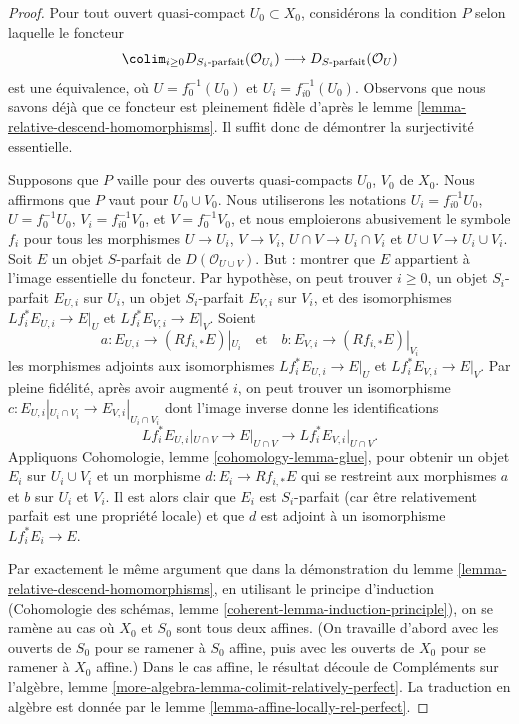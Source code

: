 \begin{proof}
Pour tout ouvert quasi-compact $U_0 \subset X_0$, considérons la condition $P$
selon laquelle le foncteur
$$
\colim_{i \geq 0} D_{S_i\text{-parfait}}(\mathcal{O}_{U_i})
\longrightarrow
D_{S\text{-parfait}}(\mathcal{O}_U)
$$
est une équivalence, où $U = f_0^{-1}(U_0)$ et $U_i = f_{i0}^{-1}(U_0)$.
Observons que nous savons déjà que ce foncteur est pleinement fidèle
d'après le lemme \ref{lemma-relative-descend-homomorphisms}. Il suffit donc de démontrer
la surjectivité essentielle.

\medskip\noindent
Supposons que $P$ vaille pour des ouverts quasi-compacts $U_0$, $V_0$ de $X_0$.
Nous affirmons que $P$ vaut pour $U_0 \cup V_0$. Nous utiliserons les notations
$U_i = f_{i0}^{-1}U_0$, $U = f_0^{-1}U_0$, $V_i = f_{i0}^{-1}V_0$,
et $V = f_0^{-1}V_0$, et nous emploierons abusivement le symbole
$f_i$ pour tous les morphismes $U \to U_i$, $V \to V_i$,
$U \cap V \to U_i \cap V_i$ et $U \cup V \to U_i \cup V_i$.
Soit $E$ un objet $S$-parfait de $D(\mathcal{O}_{U \cup V})$.
But : montrer que $E$ appartient à l'image essentielle du foncteur.
Par hypothèse,
on peut trouver $i \geq 0$, un objet $S_i$-parfait $E_{U, i}$ sur $U_i$,
un objet $S_i$-parfait $E_{V, i}$ sur $V_i$, et
des isomorphismes $Lf_i^*E_{U, i} \to E|_U$ et $Lf_i^*E_{V, i} \to E|_V$.
Soient
$$
a : E_{U, i} \to (Rf_{i, *}E)|_{U_i}
\quad\text{et}\quad
b : E_{V, i} \to (Rf_{i, *}E)|_{V_i}
$$
les morphismes adjoints aux isomorphismes $Lf_i^*E_{U, i} \to E|_U$
et $Lf_i^*E_{V, i} \to E|_V$.
Par pleine fidélité, après avoir augmenté $i$,
on peut trouver un isomorphisme
$c : E_{U, i}|_{U_i \cap V_i} \to E_{V, i}|_{U_i \cap V_i}$
dont l'image inverse donne les identifications
$$
Lf_i^*E_{U, i}|_{U \cap V} \to E|_{U \cap V} \to Lf_i^*E_{V, i}|_{U \cap V}.
$$
Appliquons Cohomologie, lemme \ref{cohomology-lemma-glue},
pour obtenir un objet $E_i$ sur $U_i \cup V_i$ et un morphisme $d : E_i \to Rf_{i, *}E$
qui se restreint aux morphismes $a$ et $b$ sur $U_i$ et $V_i$.
Il est alors clair que $E_i$ est $S_i$-parfait (car être
relativement parfait est une propriété locale) et que
$d$ est adjoint à un isomorphisme $Lf_i^*E_i \to E$.

\medskip\noindent
Par exactement le même argument que dans
la démonstration du lemme \ref{lemma-relative-descend-homomorphisms},
en utilisant le principe d'induction
(Cohomologie des schémas, lemme \ref{coherent-lemma-induction-principle}),
on se ramène au cas où $X_0$ et $S_0$ sont tous deux
affines. (On travaille d'abord avec les ouverts de $S_0$ pour se ramener à
$S_0$ affine, puis avec les ouverts de $X_0$ pour se ramener à
$X_0$ affine.) Dans le cas affine, le résultat découle de
Compléments sur l'algèbre, lemme \ref{more-algebra-lemma-colimit-relatively-perfect}.
La traduction en algèbre est donnée par le
lemme \ref{lemma-affine-locally-rel-perfect}.
\end{proof}

